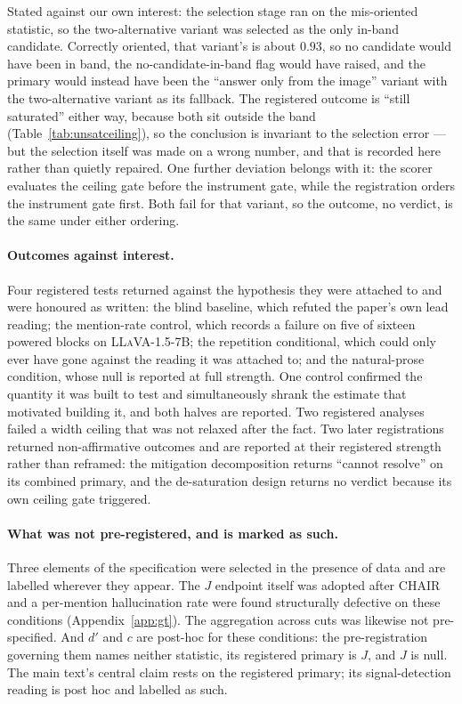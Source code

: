 Stated against our own interest: the selection stage ran on the mis-oriented statistic, so the
two-alternative variant was selected as the only in-band candidate. Correctly oriented, that variant's
\rateF{} is about $0.93$, so no candidate would have been in band, the no-candidate-in-band flag
would have raised, and the primary would instead have been the ``answer only from the image''
variant with the two-alternative variant as its fallback. The registered outcome is
``still saturated'' either way, because both sit outside the band
(Table~\ref{tab:unsatceiling}), so the conclusion is invariant to the selection error --- but the selection itself was made on a wrong number, and that
is recorded here rather than quietly repaired. One further deviation belongs with it: the scorer
evaluates the ceiling gate before the instrument gate, while the registration orders the instrument
gate first. Both fail for that variant, so the outcome, no verdict, is the same under either
ordering.

\paragraph{Outcomes against interest.} Four registered tests returned against the hypothesis they
were attached to and were honoured as written: the blind baseline, which refuted the paper's own lead
reading; the mention-rate control, which records a failure on five of sixteen powered blocks on \textsc{LLaVA-1.5-7B};
the repetition conditional, which could only ever have gone against the reading it was attached to;
and the natural-prose condition, whose null is reported at full strength. One control confirmed the
quantity it was built to test and simultaneously shrank the estimate that motivated building it, and
both halves are reported. Two registered analyses failed a width ceiling that was not relaxed after
the fact. Two later registrations returned non-affirmative outcomes and are reported at their
registered strength rather than reframed: the mitigation decomposition returns
``cannot resolve'' on its combined primary, and the de-saturation design returns no verdict
because its own ceiling gate triggered.

\paragraph{What was not pre-registered, and is marked as such.} Three elements of the specification
were selected in the presence of data and are labelled wherever they appear. The $J$ endpoint itself
was adopted after CHAIR and a per-mention hallucination rate were found structurally defective on
these conditions (Appendix~\ref{app:gt}). The aggregation across cuts was likewise not pre-specified.
And $d'$ and $c$ are post-hoc for these conditions: the pre-registration governing them names neither
statistic, its registered primary is $J$, and $J$ is null. The main text's central claim rests
on the registered primary; its signal-detection reading is post hoc and labelled as such.

